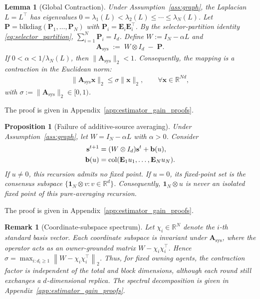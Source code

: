 \documentclass[letterpaper, 10 pt, conference]{ieeeconf} %
\newtheorem{lemma}{Lemma}
\newtheorem{proposition}{Proposition}
\newtheorem{remark}{Remark}
\DeclareMathOperator{\col}{col}
\begin{document}
\begin{lemma}[Global Contraction]\label{lem:contraction}
Under Assumption~\ref{ass:graph}, the Laplacian \(L=L^\top\) has eigenvalues \(0=\lambda_1(L)<\lambda_2(L)\le\cdots\le\lambda_N(L)\).
Let $\mathbf{P}=\mathrm{blkdiag}(\mathbf{P}_1,\dots,\mathbf{P}_N)$ with $\mathbf{P}_i=\mathbf{E}_i\mathbf{E}_i^\top$. By the selector-partition identity \eqref{eq:selector_partition}, $\sum_{i=1}^N \mathbf{P}_i = I_d$. Define $W := I_N - \alpha L$ and
\begin{align}
\mathbf{A}_{\mathrm{sys}} \;:=\; W\otimes I_d \;-\; \mathbf{P}.
\end{align}
If $0<\alpha<1/\lambda_N(L)$, then $\|\mathbf{A}_{\mathrm{sys}}\|_2<1$. Consequently, the mapping is a contraction in the Euclidean norm:
\begin{align}
\|\mathbf{A}_{\mathrm{sys}}\mathbf{x}\|_2 \le \sigma \|\mathbf{x}\|_2,\qquad \forall \mathbf{x}\in\mathbb{R}^{Nd},
\end{align}
with $\sigma:=\|\mathbf{A}_{\mathrm{sys}}\|_2\in[0,1)$.
\end{lemma}
The proof is given in Appendix~\ref{app:estimator_gain_proofs}.

\begin{proposition}[Failure of additive-source averaging]
\label{prop:no_avg}
Under Assumption~\ref{ass:graph}, let \(W=I_N-\alpha L\) with \(\alpha>0\). Consider
\begin{align}
\mathbf s^{t+1}
&=
(W\otimes I_d)\mathbf s^t+\mathbf b(u), \notag\\
\mathbf b(u)
&=
\col(\mathbf E_1u_1,\ldots,\mathbf E_Nu_N).
\end{align}
If \(u\neq0\), this recursion admits no fixed point. If \(u=0\), its fixed-point set is the consensus subspace \(\{\mathbf1_N\otimes v:v\in\mathbb R^d\}\). Consequently, \(\mathbf1_N\otimes u\) is never an isolated fixed point of this pure-averaging recursion.
\end{proposition}
The proof is given in Appendix~\ref{app:estimator_gain_proofs}.
\begin{remark}[Coordinate-subspace spectrum]\label{rem:subspace}
Let \(\chi_i\in\mathbb R^N\) denote the \(i\)-th standard basis vector. Each coordinate subspace is invariant under \(\mathbf A_{\mathrm{sys}}\), where the operator acts as an owner-grounded matrix \(W-\chi_i \chi_i^\top\). Hence \(\sigma = \max_{i:d_i\ge1} \left\|W-\chi_i \chi_i^\top\right\|_2\). Thus, for fixed owning agents, the contraction factor is independent of the total and block dimensions, although each round still exchanges a \(d\)-dimensional replica. The spectral decomposition is given in Appendix~\ref{app:estimator_gain_proofs}.
\end{remark}
\end{document}
